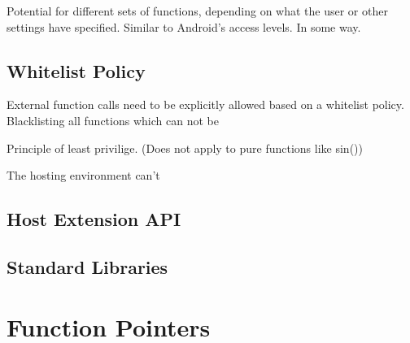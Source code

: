 Potential for different sets of functions, depending on what the user or other
settings have specified. Similar to Android's access levels. In some way.

\subsection {Whitelist Policy}

External function calls need to be explicitly allowed based on a whitelist
policy. Blacklisting all functions which can not be 

Principle of least privilige. (Does not apply to pure functions like sin())

The hosting environment can't 

\subsection {Host Extension API}

\subsection {Standard Libraries}


\section {Function Pointers}


